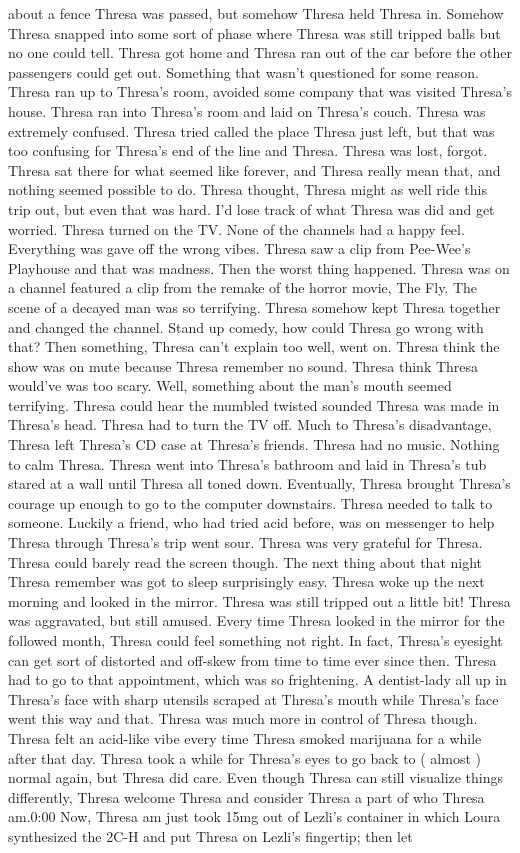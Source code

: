 \documentclass[12pt]{book}
\begin{document}
about a fence Thresa was passed, but somehow Thresa held Thresa in. Somehow Thresa snapped into some sort of phase where Thresa was still tripped balls but no one could tell. Thresa got home and Thresa ran out of the car before the other passengers could get out. Something that wasn't questioned for some reason. Thresa ran up to Thresa's room, avoided some company that was visited Thresa's house. Thresa ran into Thresa's room and laid on Thresa's couch. Thresa was extremely confused. Thresa tried called the place Thresa just left, but that was too confusing for Thresa's end of the line and Thresa. Thresa was lost, forgot. Thresa sat there for what seemed like forever, and Thresa really mean that, and nothing seemed possible to do. Thresa thought, Thresa might as well ride this trip out, but even that was hard. I'd lose track of what Thresa was did and get worried. Thresa turned on the TV. None of the channels had a happy feel. Everything was gave off the wrong vibes. Thresa saw a clip from Pee-Wee's Playhouse and that was madness. Then the worst thing happened. Thresa was on a channel featured a clip from the remake of the horror movie, The Fly. The scene of a decayed man was so terrifying. Thresa somehow kept Thresa together and changed the channel. Stand up comedy, how could Thresa go wrong with that? Then something, Thresa can't explain too well, went on. Thresa think the show was on mute because Thresa remember no sound. Thresa think Thresa would've was too scary. Well, something about the man's mouth seemed terrifying. Thresa could hear the mumbled twisted sounded Thresa was made in Thresa's head. Thresa had to turn the TV off. Much to Thresa's disadvantage, Thresa left Thresa's CD case at Thresa's friends. Thresa had no music. Nothing to calm Thresa. Thresa went into Thresa's bathroom and laid in Thresa's tub stared at a wall until Thresa all toned down. Eventually, Thresa brought Thresa's courage up enough to go to the computer downstairs. Thresa needed to talk to someone. Luckily a friend, who had tried acid before, was on messenger to help Thresa through Thresa's trip went sour. Thresa was very grateful for Thresa. Thresa could barely read the screen though. The next thing about that night Thresa remember was got to sleep surprisingly easy. Thresa woke up the next morning and looked in the mirror. Thresa was still tripped out a little bit! Thresa was aggravated, but still amused. Every time Thresa looked in the mirror for the followed month, Thresa could feel something not right. In fact, Thresa's eyesight can get sort of distorted and off-skew from time to time ever since then. Thresa had to go to that appointment, which was so frightening. A dentist-lady all up in Thresa's face with sharp utensils scraped at Thresa's mouth while Thresa's face went this way and that. Thresa was much more in control of Thresa though. Thresa felt an acid-like vibe every time Thresa smoked marijuana for a while after that day. Thresa took a while for Thresa's eyes to go back to ( almost ) normal again, but Thresa did care. Even though Thresa can still visualize things differently, Thresa welcome Thresa and consider Thresa a part of who Thresa am.0:00 Now, Thresa am just took 15mg out of Lezli's container in which Loura synthesized the 2C-H and put Thresa on Lezli's fingertip; then let 
\end{document}
